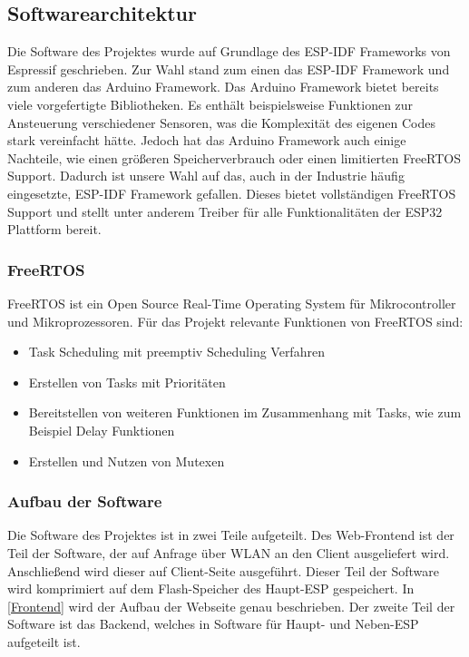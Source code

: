 \subsection{Softwarearchitektur}

Die Software des Projektes wurde auf Grundlage des ESP-IDF Frameworks von Espressif geschrieben.
Zur Wahl stand zum einen das ESP-IDF Framework und zum anderen das Arduino Framework.
Das Arduino Framework bietet bereits viele vorgefertigte Bibliotheken.
Es enthält beispielsweise Funktionen zur Ansteuerung verschiedener Sensoren, was die Komplexität des eigenen Codes stark vereinfacht hätte.
Jedoch hat das Arduino Framework auch einige Nachteile, wie einen größeren Speicherverbrauch oder einen limitierten FreeRTOS Support.
Dadurch ist unsere Wahl auf das, auch in der Industrie häufig eingesetzte, ESP-IDF Framework gefallen.
Dieses bietet vollständigen FreeRTOS Support und stellt unter anderem Treiber für alle Funktionalitäten der ESP32 Plattform bereit.

\subsubsection{FreeRTOS}

FreeRTOS ist ein Open Source Real-Time Operating System für Mikrocontroller und Mikroprozessoren.
Für das Projekt relevante Funktionen von FreeRTOS sind:
\begin{itemize}
    \item Task Scheduling mit preemptiv Scheduling Verfahren
    \item Erstellen von Tasks mit Prioritäten
    \item Bereitstellen von weiteren Funktionen im Zusammenhang mit Tasks, wie zum Beispiel Delay Funktionen
    \item Erstellen und Nutzen von Mutexen
\end{itemize}

\subsubsection{Aufbau der Software}

Die Software des Projektes ist in zwei Teile aufgeteilt.
Des Web-Frontend ist der Teil der Software, der auf Anfrage über WLAN an den Client ausgeliefert wird.
Anschließend wird dieser auf Client-Seite ausgeführt.
Dieser Teil der Software wird komprimiert auf dem Flash-Speicher des Haupt-ESP gespeichert.
In \autoref{Frontend} wird der Aufbau der Webseite genau beschrieben.
Der zweite Teil der Software ist das Backend, welches in Software für Haupt- und Neben-ESP aufgeteilt ist.

